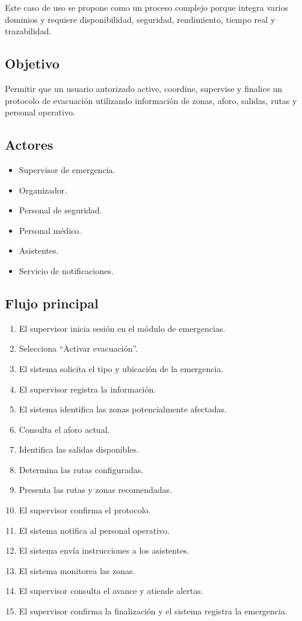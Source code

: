 \documentclass[12pt,a4paper]{article}
\begin{document}
Este caso de uso se propone como un proceso complejo porque integra varios dominios y requiere disponibilidad, seguridad, rendimiento, tiempo real y trazabilidad.

\subsection{Objetivo}

Permitir que un usuario autorizado active, coordine, supervise y finalice un protocolo de evacuación utilizando información de zonas, aforo, salidas, rutas y personal operativo.

\subsection{Actores}

\begin{itemize}
\item Supervisor de emergencia.
\item Organizador.
\item Personal de seguridad.
\item Personal médico.
\item Asistentes.
\item Servicio de notificaciones.
\end{itemize}

\subsection{Flujo principal}

\begin{enumerate}
\item El supervisor inicia sesión en el módulo de emergencias.
\item Selecciona ``Activar evacuación''.
\item El sistema solicita el tipo y ubicación de la emergencia.
\item El supervisor registra la información.
\item El sistema identifica las zonas potencialmente afectadas.
\item Consulta el aforo actual.
\item Identifica las salidas disponibles.
\item Determina las rutas configuradas.
\item Presenta las rutas y zonas recomendadas.
\item El supervisor confirma el protocolo.
\item El sistema notifica al personal operativo.
\item El sistema envía instrucciones a los asistentes.
\item El sistema monitorea las zonas.
\item El supervisor consulta el avance y atiende alertas.
\item El supervisor confirma la finalización y el sistema registra la emergencia.
\end{enumerate}
\end{document}
